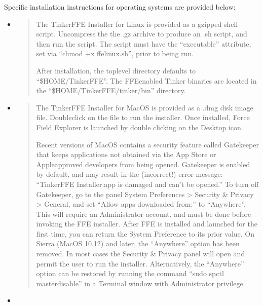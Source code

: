 \documentclass[letterpaper,11pt,english]{sphinxmanual}
\begin{document}
Specific installation instructions for operating systems are provided below:
\begin{itemize}
\item {} 
\begin{quote}

The Tinker\sphinxhyphen{}FFE Installer for Linux is provided as a gzipped shell script. Uncompress the the .gz archive to produce an .sh script, and then run the script. The script must have the “executable” attribute, set via “chmod +x ffe\sphinxhyphen{}linux.sh”, prior to being run.

After installation, the top\sphinxhyphen{}level directory defaults to “\$HOME/Tinker\sphinxhyphen{}FFE”. The FFE\sphinxhyphen{}enabled Tinker binaries are located in the “\$HOME/Tinker\sphinxhyphen{}FFE/tinker/bin” directory.
\end{quote}

\item {} 
\begin{quote}

The Tinker\sphinxhyphen{}FFE Installer for MacOS is provided as a .dmg disk image file. Double\sphinxhyphen{}click on the file to run the installer. Once installed, Force Field Explorer is launched by double clicking on the Desktop icon.

Recent versions of MacOS contains a security feature called Gatekeeper that keeps applications not obtained via the App Store or Apple\sphinxhyphen{}approved developers from being opened. Gatekeeper is enabled by default, and may result in the (incorrect!) error message: “Tinker\sphinxhyphen{}FFE Installer.app is damaged and can’t be opened.” To turn off Gatekeeper, go to the panel System Preferences \textgreater{} Security \& Privacy \textgreater{} General, and set “Allow apps downloaded from:” to “Anywhere”. This will require an Administrator account, and must be done before invoking the FFE installer. After FFE is installed and launched for the first time, you can return the System Preference to its prior value. On Sierra (MacOS 10.12) and later, the “Anywhere” option has been removed. In most cases the Security \& Privacy panel will open and permit the user to run the installer. Alternatively, the “Anywhere” option can be restored by running the command “sudo spctl \textendash{}master\sphinxhyphen{}disable” in a Terminal window with Administrator privilege.
\end{quote}

\item {} 
\begin{quote}


\end{quote}
\end{itemize}
\end{document}
